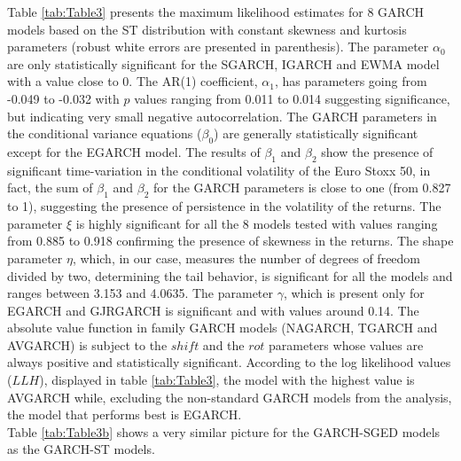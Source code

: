 \documentclass[a4paper, nobind]{templates/ociamthesis}
\begin{document}
\clearpage
\newpage

\noindent Table \ref{tab:Table3} presents the maximum likelihood estimates for 8 GARCH models based on the ST distribution with constant skewness and kurtosis parameters (robust white errors are presented in parenthesis). The parameter \(\alpha_0\) are only statistically significant for the SGARCH, IGARCH and EWMA model with a value close to 0. The AR(1) coefficient, \(\alpha_1\), has parameters going from -0.049 to -0.032 with \(p\) values ranging from 0.011 to 0.014 suggesting significance, but indicating very small negative autocorrelation. The GARCH parameters in the conditional variance equations (\(\beta_0\)) are generally statistically significant except for the EGARCH model. The results of \(\beta_1\) and \(\beta_2\) show the presence of significant time-variation in the conditional volatility of the Euro Stoxx 50, in fact, the sum of \(\beta_1\) and \(\beta_2\) for the GARCH parameters is close to one (from 0.827 to 1), suggesting the presence of persistence in the volatility of the returns. The parameter \(\xi\) is highly significant for all the 8 models tested with values ranging from 0.885 to 0.918 confirming the presence of skewness in the returns. The shape parameter \(\eta\), which, in our case, measures the number of degrees of freedom divided by two, determining the tail behavior, is significant for all the models and ranges between 3.153 and 4.0635. The parameter \(\gamma\), which is present only for EGARCH and GJRGARCH is significant and with values around 0.14. The absolute value function in family GARCH models (NAGARCH, TGARCH and AVGARCH) is subject to the \(shift\) and the \(rot\) parameters whose values are always positive and statistically significant. According to the log likelihood values (\(LLH\)), displayed in table \ref{tab:Table3}, the model with the highest value is AVGARCH while, excluding the non-standard GARCH models from the analysis, the model that performs best is EGARCH.~\\

\noindent Table \ref{tab:Table3b} shows a very similar picture for the GARCH-SGED models as the GARCH-ST models.
\end{document}
